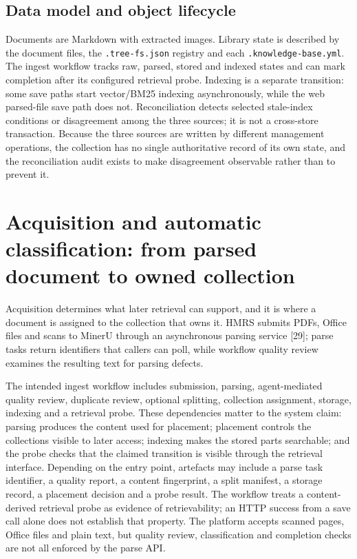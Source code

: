 \documentclass[11pt]{article}
\begin{document}
\subsection{Data model and object lifecycle}



Documents are Markdown with extracted images. Library state is described by
the document files, the \texttt{.tree-fs.json} registry and each
\texttt{.knowledge-base.yml}. The ingest workflow tracks raw, parsed, stored
and indexed states and can mark completion after its configured retrieval
probe. Indexing is a separate transition: some save paths start vector/BM25
indexing asynchronously, while the web parsed-file save path does not.
Reconciliation detects selected stale-index conditions or disagreement among
the three sources; it is not a cross-store transaction. Because the three
sources are written by different management operations, the collection has no
single authoritative record of its own state, and the reconciliation audit
exists to make disagreement observable rather than to prevent it.


\section{Acquisition and automatic classification: from parsed document to
owned collection}


Acquisition determines what later retrieval can support, and it is where a
document is assigned to the collection that owns it. HMRS submits PDFs,
Office files and scans to MinerU through an asynchronous parsing service
[29]; parse tasks return identifiers that callers can poll, while
workflow quality review examines the resulting text for parsing defects.

The intended ingest workflow includes submission, parsing,
agent-mediated quality review, duplicate review, optional splitting, collection
assignment, storage, indexing and a retrieval probe. These dependencies matter to
the system claim: parsing produces the content used for placement; placement
controls the collections visible to later access; indexing makes the stored
parts searchable; and the probe checks that the claimed transition is visible
through the retrieval interface. Depending on the entry point, artefacts may
include a parse task identifier, a quality report, a content fingerprint, a
split manifest, a storage record, a placement decision and a probe result. The
workflow treats a content-derived retrieval probe as evidence of retrievability;
an HTTP success from a save call alone does not establish that property. The
platform accepts scanned pages, Office files and plain text, but quality review,
classification and completion checks are not all enforced by the parse API.
\end{document}
